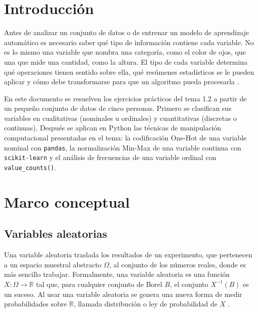 \documentclass[11pt,letterpaper]{article}
\begin{document}
\portada
\indicegeneral


\section{Introducción}

Antes de analizar un conjunto de datos o de entrenar un modelo de aprendizaje automático es necesario saber qué tipo de información contiene cada variable. No es lo mismo una variable que nombra una categoría, como el color de ojos, que una que mide una cantidad, como la altura. El tipo de cada variable determina qué operaciones tienen sentido sobre ella, qué resúmenes estadísticos se le pueden aplicar y cómo debe transformarse para que un algoritmo pueda procesarla \parencite{tecnm2026_documento_fuente,bruce2020}.

En este documento se resuelven los ejercicios prácticos del tema 1.2 a partir de un pequeño conjunto de datos de cinco personas. Primero se clasifican sus variables en cualitativas (nominales u ordinales) y cuantitativas (discretas o continuas). Después se aplican en Python las técnicas de manipulación computacional presentadas en el tema: la codificación One-Hot de una variable nominal con \texttt{pandas}, la normalización Min-Max de una variable continua con \texttt{scikit-learn} y el análisis de frecuencias de una variable ordinal con \texttt{value\_counts()}.

\section{Marco conceptual}

\subsection{Variables aleatorias}

Una variable aleatoria traslada los resultados de un experimento, que pertenecen a un espacio muestral abstracto $\Omega$, al conjunto de los números reales, donde es más sencillo trabajar. Formalmente, una variable aleatoria es una función $X : \Omega \to \mathbb{R}$ tal que, para cualquier conjunto de Borel $B$, el conjunto $X^{-1}(B)$ es un suceso. Al usar una variable aleatoria se genera una nueva forma de medir probabilidades sobre $\mathbb{R}$, llamada distribución o ley de probabilidad de $X$ \parencite{tecnm2026_documento_fuente}.
\end{document}
